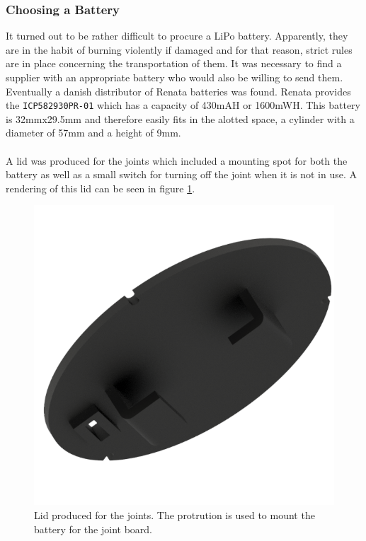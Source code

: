 \subsubsection{Choosing a Battery} %
\label{ssub:choosing_a_battery}
It turned out to be rather difficult to procure a LiPo battery.
Apparently, they are in the habit of burning violently if damaged and for that reason, strict rules are in place concerning the transportation of them.
It was necessary to find a supplier with an appropriate battery who would also be willing to send them.
Eventually a danish distributor of Renata batteries was found.
Renata provides the \texttt{ICP582930PR-01} which has a capacity of 430mAH or 1600mWH.
This battery is 32mmx29.5mm and therefore easily fits in the alotted space, a cylinder with a diameter of 57mm and a height of 9mm.
\\~\\
A lid was produced for the joints which included a mounting spot for both the battery as well as a small switch for turning off the joint when it is not in use.
A rendering of this lid can be seen in figure \ref{fig:joint_lid}.

\begin{figure}[h]
	\centering
	\includegraphics[width=.4\linewidth]{graphics/joint_lid}
	\caption[Lid produced for the joints.]{Lid produced for the joints. The protrution is used to mount the battery for the joint board.}
	\label{fig:joint_lid}
\end{figure}